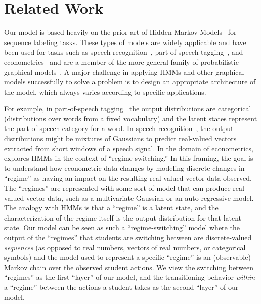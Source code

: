 \section{Related Work}

Our model is based heavily on the prior art of Hidden Markov
Models~\cite{Rabiner:1990:RSR} for sequence labeling tasks. These types of
models are widely applicable and have been used for tasks such as speech
recognition~\cite{Huang:1990:HMM}, part-of-speech
tagging~\cite{Jurafsky:2009:SLP}, and econometrics~\cite{Hamilton:1990:JoE}
and are a member of the more general family of probabilistic graphical
models~\cite{Koller:2009:PGM}.  A major challenge in applying HMMs and
other graphical models successfully to solve a problem is to design an
appropriate architecture of the model, which always varies according to
specific applications.

For example, in part-of-speech tagging~\cite{Jurafsky:2009:SLP} the output
distributions are categorical (distributions over words from a fixed
vocabulary) and the latent states represent the part-of-speech category for
a word. In speech recognition~\cite{Huang:1990:HMM}, the output
distributions might be mixtures of Gaussians to predict real-valued vectors
extracted from short windows of a speech signal. In the domain of
econometrics, \citet{Hamilton:1990:JoE} explores HMMs in the context of
``regime-switching.'' In this framing, the goal is to understand how
econometric data changes by modeling discrete changes in ``regime'' as
having an impact on the resulting real-valued vector data observed. The
``regimes'' are represented with some sort of model that can produce
real-valued vector data, such as a multivariate Gaussian or an
auto-regressive model. The analogy with HMMs is that a ``regime'' is a
latent state, and the characterization of the regime itself is the output
distribution for that latent state. Our model can be seen as such a
``regime-switching'' model where the output of the ``regimes'' that
students are switching between are discrete-valued \emph{sequences} (as
opposed to real numbers, vectors of real numbers, or categorical symbols)
and the model used to represent a specific ``regime'' is an (observable)
Markov chain over the observed student actions. We view the switching
between ``regimes'' as the first ``layer'' of our model, and the
transitioning behavior \emph{within} a ``regime'' between the actions a
student takes as the second ``layer'' of our model.

